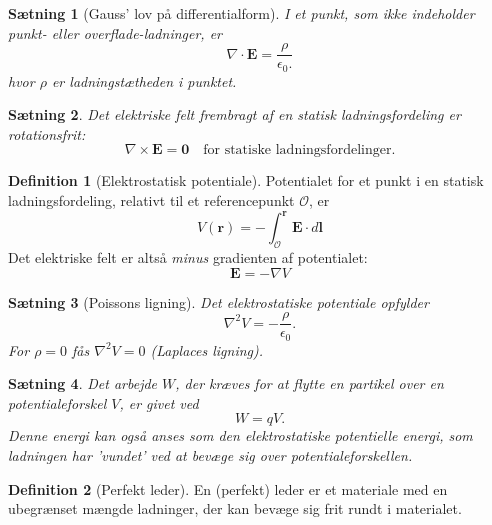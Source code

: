 \documentclass[]{article}
\newtheorem{theorem}{Sætning}
\theoremstyle{definition}
\newtheorem{definition}{Definition}
\begin{document}
\begin{theorem}[Gauss' lov på differentialform]
	I et punkt, som ikke indeholder punkt- eller overflade-ladninger, er
	\begin{equation*}
		\nabla \cdot \mathbf{E} = \dfrac{\rho}{\epsilon_0.}
	\end{equation*}
	hvor $\rho$ er ladningstætheden i punktet.
\end{theorem}

\begin{theorem}
	Det elektriske felt frembragt af en statisk ladningsfordeling er rotationsfrit:
	\begin{equation*}
		\nabla \times \mathbf{E} = \mathbf{0} \quad \text{for statiske ladningsfordelinger.}
	\end{equation*}
\end{theorem}

\begin{definition}[Elektrostatisk potentiale]
	Potentialet for et punkt i en statisk ladningsfordeling, relativt til et referencepunkt $\mathcal{O}$, er
	\begin{equation*}
		V(\mathbf{r}) = -\int_\mathcal{O}^{\mathbf{r}} \mathbf{E} \cdot d \mathbf{l}
	\end{equation*}
	Det elektriske felt er altså \emph{minus} gradienten af potentialet:
	\begin{equation*}
		\mathbf{E} = -\nabla V
	\end{equation*}
\end{definition}

\begin{theorem}[Poissons ligning]
	Det elektrostatiske potentiale opfylder 
	\begin{equation*}
		\nabla^2 V = -\frac{\rho}{\epsilon_0}.
	\end{equation*}
	For $\rho = 0$ fås $	\nabla^2 V  = 0$ (Laplaces ligning).
\end{theorem}

\begin{theorem}
	Det arbejde $W$, der kræves for at flytte en partikel over en potentialeforskel $V$, er givet ved
	\begin{equation*}
		W = qV.
	\end{equation*}
	Denne energi kan også anses som den elektrostatiske potentielle energi, som ladningen har 'vundet' ved at bevæge sig over potentialeforskellen.
\end{theorem}

\begin{definition}[Perfekt leder]
	En (perfekt) leder er et materiale med en ubegrænset mængde ladninger, der kan bevæge sig frit rundt i materialet.
\end{definition}
\end{document}
